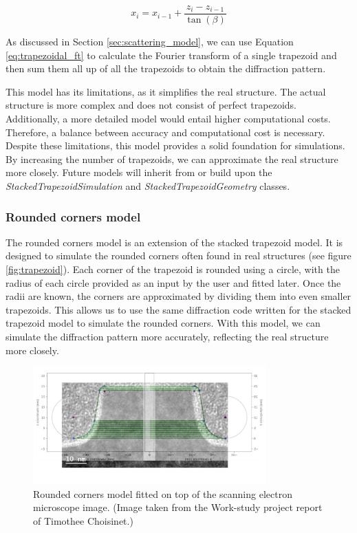 \medskip

\begin{equation}
    x_{i} = x_{i-1} + \frac{z_{i} - z_{i-1}}{\tan(\beta)}
\end{equation}

\medskip

As discussed in Section \ref{sec:scattering_model}, we can use Equation \ref{eq:trapezoidal_ft} 
to calculate the Fourier transform of a single trapezoid and then sum them all up of 
all the trapezoids to obtain the diffraction pattern.

\medskip

This model has its limitations, as it simplifies the real structure. The actual structure is more 
complex and does not consist of perfect trapezoids. Additionally, a more detailed model would 
entail higher computational costs. Therefore, a balance between accuracy and computational cost 
is necessary. Despite these limitations, this model provides a solid foundation for simulations. 
By increasing the number of trapezoids, we can approximate the real structure more closely. Future
models will inherit from or build upon the \textit{StackedTrapezoidSimulation} and 
\textit{StackedTrapezoidGeometry} classes.

\medskip

\subsubsection{Rounded corners model}

The rounded corners model is an extension of the stacked trapezoid model. It is designed to 
simulate the rounded corners often found in real structures (see figure \ref{fig:trapezoid}). 
Each corner of the trapezoid is rounded using a circle, with the radius of each circle provided 
as an input by the user and fitted later. Once the radii are known, the corners are approximated 
by dividing them into even smaller trapezoids. This allows us to use the same diffraction code written for the
stacked trapezoid model to simulate the rounded corners. With this model, we can simulate the 
diffraction pattern more accurately, reflecting the real structure more closely.

\begin{figure}[h]
    \centering
    \includegraphics[width=0.8\textwidth]{images/rounded.PNG}
    \caption{Rounded corners model fitted on top of the scanning electron microscope image. (Image taken from the Work-study project report of Timothee Choisinet.) }
    \label{fig:rounded_corners}
\end{figure}

